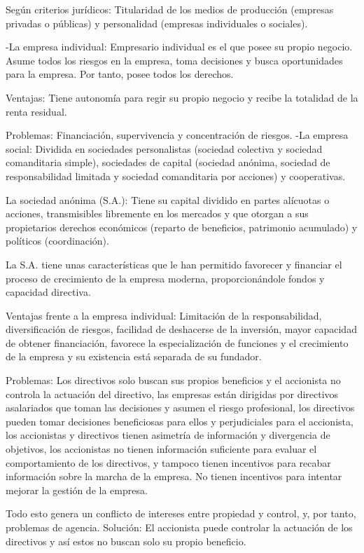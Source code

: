 \documentclass[12pt, twoside, openright]{report} %
\begin{document}
Según criterios jurídicos: Titularidad de los medios de producción (empresas privadas o públicas) y
personalidad (empresas individuales o sociales).

-La empresa individual: Empresario individual es el que posee su propio negocio. Asume todos los riesgos en
la empresa, toma decisiones y busca oportunidades para la empresa. Por tanto, posee todos los derechos.

Ventajas: Tiene autonomía para regir su propio negocio y recibe la totalidad de la renta residual.

Problemas: Financiación, supervivencia y concentración de riesgos.
\pagebreak
-La empresa social: Dividida en sociedades personalistas (sociedad colectiva y sociedad comanditaria simple),
sociedades de capital (sociedad anónima, sociedad de responsabilidad limitada y sociedad comanditaria por
acciones) y cooperativas.

La sociedad anónima (S.A.): Tiene su capital dividido en partes alícuotas o acciones, transmisibles libremente
en los mercados y que otorgan a sus propietarios derechos económicos (reparto de beneficios, patrimonio
acumulado) y políticos (coordinación).

La S.A. tiene unas características que le han permitido favorecer y financiar el proceso de crecimiento de la
empresa moderna, proporcionándole fondos y capacidad directiva.

Ventajas frente a la empresa individual: Limitación de la responsabilidad, diversificación de riesgos, facilidad
de deshacerse de la inversión, mayor capacidad de obtener financiación, favorece la especialización de
funciones y el crecimiento de la empresa y su existencia está separada de su fundador.

Problemas: Los directivos solo buscan sus propios beneficios y el accionista no controla la actuación del
directivo, las empresas están dirigidas por directivos asalariados que toman las decisiones y asumen el riesgo
profesional, los directivos pueden tomar decisiones beneficiosas para ellos y perjudiciales para el accionista,
los accionistas y directivos tienen asimetría de información y divergencia de objetivos, los accionistas no
tienen información suficiente para evaluar el comportamiento de los directivos, y tampoco tienen incentivos
para recabar información sobre la marcha de la empresa. No tienen incentivos para intentar mejorar la
gestión de la empresa.

Todo esto genera un conflicto de intereses entre propiedad y control, y, por tanto, problemas de agencia.
Solución: El accionista puede controlar la actuación de los directivos y así estos no buscan solo su propio
beneficio.
\end{document}
